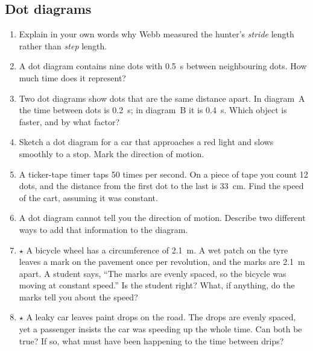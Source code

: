 \documentclass[11pt,twoside,openany]{book}
\begin{document}
\subsection*{Dot diagrams}
\begin{enumerate}[label=\textbf{\thechapter.\arabic*},series=exercises,leftmargin=*]
  \item Explain in your own words why Webb measured the hunter's \emph{stride} length rather than \emph{step} length.
  \item A dot diagram contains nine dots with \SI{0.5}{\second} between neighbouring dots. How much time does it represent?
  \item Two dot diagrams show dots that are the same distance apart. In diagram~A the time between dots is \SI{0.2}{\second}; in diagram~B it is \SI{0.4}{\second}. Which object is faster, and by what factor?
  \item Sketch a dot diagram for a car that approaches a red light and slows smoothly to a stop. Mark the direction of motion.
  \item A ticker-tape timer taps \num{50} times per second. On a piece of tape you count \num{12} dots, and the distance from the first dot to the last is \SI{33}{\centi\metre}. Find the speed of the cart, assuming it was constant.
  \item A dot diagram cannot tell you the direction of motion. Describe two different ways to add that information to the diagram.
  \item $\star$ A bicycle wheel has a circumference of \SI{2.1}{\metre}. A wet patch on the tyre leaves a mark on the pavement once per revolution, and the marks are \SI{2.1}{\metre} apart. A student says, ``The marks are evenly spaced, so the bicycle was moving at constant speed.'' Is the student right? What, if anything, do the marks tell you about the speed?
  \item $\star$ A leaky car leaves paint drops on the road. The drops are evenly spaced, yet a passenger insists the car was speeding up the whole time. Can both be true? If so, what must have been happening to the time between drips?
\end{enumerate}
\end{document}
